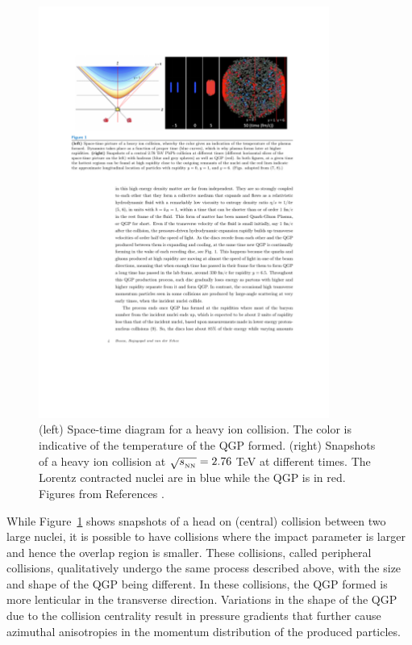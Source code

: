 \begin{figure}[htbp]
\begin{center}
\includegraphics[width=0.85\textwidth]{figures/theory/qgp_formation}
\caption{(left) Space-time diagram for a heavy ion collision. The color is indicative of the temperature of the QGP formed. (right) Snapshots of a heavy ion collision at $\mbox{$\sqrt{s_{_\text{NN}}}$} = 2.76$ TeV at different times. The Lorentz contracted nuclei are in blue while the QGP is in red. Figures from References \cite{7, 8}.  }
\label{fig:qgp_form}
\end{center}
\end{figure}

While Figure~\ref{fig:qgp_form} shows snapshots of a head on (central) collision between two large nuclei, it is possible to have collisions where the impact parameter is larger and hence the overlap region is smaller. These collisions, called peripheral collisions, qualitatively undergo the same process described above, with the size and shape of the QGP being different. In these collisions, the QGP formed is more lenticular in the transverse direction. Variations in the shape of the QGP due to the collision centrality result in pressure gradients that further cause azimuthal anisotropies in the momentum distribution of the produced particles. 

